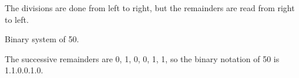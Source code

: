 \documentclass[11pt,class=report,crop=false]{standalone}
\begin{document}
\begin{cours}
\begin{exemple}
The divisions are done from left to right, but the remainders are read from right to left.

\end{exemple}

\begin{exemple}
Binary system of 50.


The successive remainders are 0, 1, 0, 0, 1, 1, so the binary notation of 50 is 1.1.0.0.1.0.
\end{exemple}


\end{cours}



\end{document}
